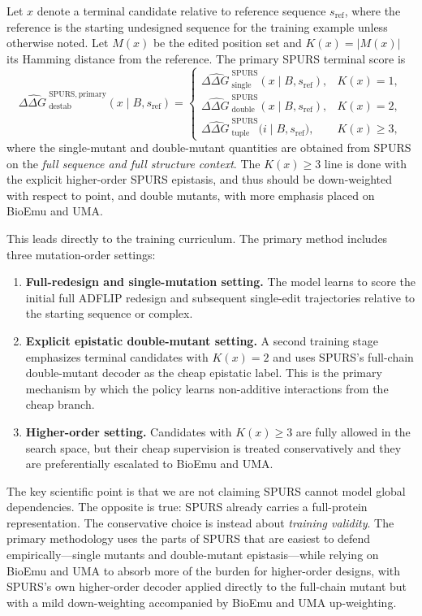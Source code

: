 \documentclass[11pt]{article}
\newcommand{\ddG}{\ensuremath{\Delta\Delta G \ }}
\begin{document}
Let $x$ denote a terminal candidate relative to reference sequence $s_{\mathrm{ref}}$, where the reference is the starting undesigned sequence for the training example unless otherwise noted. Let $M(x)$ be the edited position set and $K(x)=|M(x)|$ its Hamming distance from the reference. The primary SPURS terminal score is
\begin{equation}
\label{eq:spursglobalprimary}
\widehat{\ddG}^{\mathrm{SPURS,primary}}_{\mathrm{destab}}(x\mid B,s_{\mathrm{ref}})
=
\begin{cases}
\widehat{\ddG}^{\mathrm{SPURS}}_{\mathrm{single}}(x\mid B,s_{\mathrm{ref}}), & K(x)=1,\\[4pt]
\widehat{\ddG}^{\mathrm{SPURS}}_{\mathrm{double}}(x\mid B,s_{\mathrm{ref}}), & K(x)=2,\\[4pt]
\widehat{\ddG}^{\mathrm{SPURS}}_{\mathrm{tuple}}\!\big(i\mid B,s_{\mathrm{ref}}\big), & K(x)\ge 3,
\end{cases}
\end{equation}
where the single-mutant and double-mutant quantities are obtained from SPURS on the \emph{full sequence and full structure context}. The $K(x)\ge 3$ line is done with the explicit higher-order SPURS epistasis, and thus should be down-weighted with respect to point, and double mutants, with more emphasis placed on BioEmu and UMA. 

This leads directly to the training curriculum. The primary method includes three mutation-order settings:
\begin{enumerate}[leftmargin=1.5em]
    \item \textbf{Full-redesign and single-mutation setting.} The model learns to score the initial full ADFLIP redesign and subsequent single-edit trajectories relative to the starting sequence or complex.
    \item \textbf{Explicit epistatic double-mutant setting.} A second training stage emphasizes terminal candidates with $K(x)=2$ and uses SPURS's full-chain double-mutant decoder as the cheap epistatic label. This is the primary mechanism by which the policy learns non-additive interactions from the cheap branch.
    \item \textbf{Higher-order setting.} Candidates with $K(x)\ge 3$ are fully allowed in the search space, but their cheap supervision is treated conservatively and they are preferentially escalated to BioEmu and UMA. 
\end{enumerate}

The key scientific point is that we are not claiming SPURS cannot model global dependencies. The opposite is true: SPURS already carries a full-protein representation. The conservative choice is instead about \emph{training validity}. The primary methodology uses the parts of SPURS that are easiest to defend empirically---single mutants and double-mutant epistasis---while relying on BioEmu and UMA to absorb more of the burden for higher-order designs, with SPURS's own higher-order decoder applied directly to the full-chain mutant but with a mild down-weighting accompanied by BioEmu and UMA up-weighting.
\end{document}

